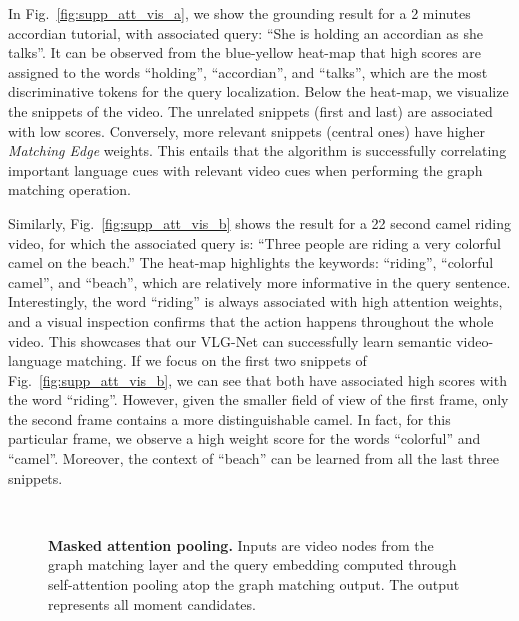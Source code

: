 \documentclass[10pt,twocolumn,letterpaper]{article}
\begin{document}
In Fig.~\ref{fig:supp_att_vis_a}, we show the grounding result for a 2 minutes accordian tutorial, with associated query: ``She is holding an accordian as she talks''. It can be observed from the blue-yellow heat-map that high scores are assigned to the words ``holding'', ``accordian'', and ``talks'', which are the most discriminative tokens for the query localization.
Below the heat-map, we visualize the snippets of the video. The unrelated snippets (first and last) are associated with low scores. Conversely, more relevant snippets (central ones) have higher \textit{Matching Edge} weights. This entails that the algorithm is successfully correlating important language cues with relevant video cues when performing the graph matching operation.  

Similarly, Fig.~\ref{fig:supp_att_vis_b} shows the result for a 22 second camel riding video, for which the associated query is: ``Three people are riding a very colorful camel on the beach.'' The heat-map highlights the keywords: ``riding'', ``colorful camel'', and ``beach'', which are relatively more informative in the query sentence. Interestingly, the word ``riding'' is always associated with high attention weights, and a visual inspection confirms that the action happens throughout the whole video. This showcases that our VLG-Net can successfully learn semantic video-language matching.
If we focus on the first two snippets of Fig.~\ref{fig:supp_att_vis_b}, we can see that both have associated high scores with the word ``riding''. However, given the smaller field of view of the first frame, only the second frame contains a more distinguishable camel. In fact, for this particular frame, we observe a high weight score for the words ``colorful'' and ``camel''. Moreover, the context of ``beach'' can be learned from all the last three snippets.





\begin{figure}[!ht]
\captionsetup[subfigure]{labelformat=empty}
\begin{center}

    \\
    


    \vspace{.1cm}
     \caption{\textbf{Masked attention pooling.} Inputs are video nodes  from the graph matching layer and the query embedding  computed through self-attention pooling atop the graph matching output. The output  represents all moment candidates.}
    \label{fig:att}
    
\end{center}
\end{figure}
\end{document}
